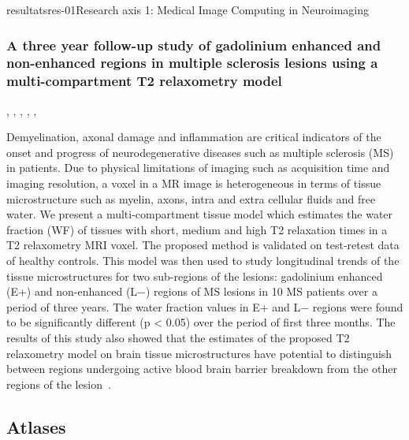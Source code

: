 \documentclass{ra2018}
\begin{document}
\begin{module}{resultats}{res-01}{Research axis 1: Medical Image Computing in Neuroimaging}
\subsubsection{A three year follow-up study of gadolinium enhanced and non-enhanced regions in multiple sclerosis lesions using a multi-compartment T2 relaxometry model}
\begin{participants}
      , 
      ,
      ,
      ,
      ,
\end{participants}
Demyelination, axonal damage and inflammation are critical indicators of the onset and progress of neurodegenerative diseases such as multiple sclerosis (MS) in patients. Due to physical limitations of imaging such as acquisition time and imaging resolution, a voxel in a MR image is heterogeneous in terms of tissue microstructure such as myelin, axons, intra and extra cellular fluids and free water. We present a multi-compartment tissue model which estimates the water fraction (WF) of tissues with short, medium and high T2 relaxation times in a T2 relaxometry MRI voxel. The proposed method is validated on test-retest data of healthy controls. This model was then used to study longitudinal trends of the tissue microstructures for two sub-regions of the lesions: gadolinium enhanced (E+) and non-enhanced (L−) regions of MS lesions in 10 MS patients over a period of three years. The water fraction values in E+ and L− regions were found to be significantly different (p < 0.05) over the period of first three months. The results of this study also showed that the estimates of the proposed T2 relaxometry model on brain tissue microstructures have potential to distinguish between regions undergoing active blood brain barrier breakdown from the other regions of the lesion~\cite{chatterjee:hal-01837974}.

\subsection{Atlases}

\end{module}
\end{document}
